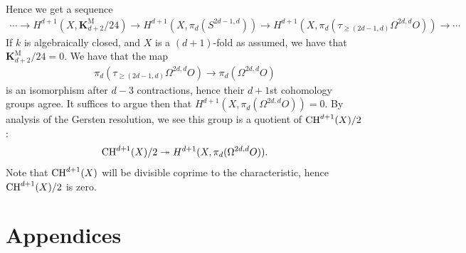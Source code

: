 \documentclass[11pt,openany]{book}
\providecommand{\KM}{\mathbf{K}^\mathrm{M}}
\begin{document}
Hence we get a sequence
\begin{align*}
    \cdots \to H^{d+1}(X,\KM_{d+2}/24) \to H^{d+1}(X, \pi_d(S^{2d-1,d})) \to H^{d+1}(X, \pi_d(\tau_{\ge(2d-1,d)}\Omega^{2d,d}O)) \to \cdots 
\end{align*}
If $k$ is algebraically closed, and $X$ is a $(d+1)$-fold as assumed, we have that $\KM_{d+2}/24 = 0$. We have that the map
\begin{align*}
    \pi_d(\tau_{\ge(2d-1,d)}\Omega^{2d,d}O) \to \pi_d(\Omega^{2d,d}O)
\end{align*}
is an isomorphism after $d-3$ contractions, hence their $d+1$st cohomology groups agree. It suffices to argue then that $H^{d+1}(X,\pi_d(\Omega^{2d,d}O)) = 0$. By analysis of the Gersten resolution, we see this group is a quotient of $\mathrm{CH}^{d+1}(X)/2$:
\begin{align*}
    \mathrm{CH}^{d+1}(X)/2 \twoheadrightarrow H^{d+1}(X, \pi_d(\Omega^{2d,d}O)).
\end{align*}
Note that $\mathrm{CH}^{d+1}(X)$ will be divisible coprime to the characteristic, hence $\mathrm{CH}^{d+1}(X)/2$ is zero.


\chapter{Appendices}





\printbibliography
\end{document}
